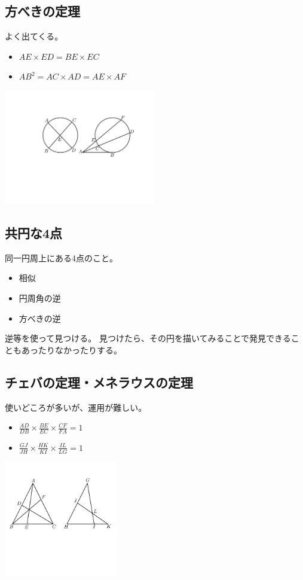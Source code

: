 \documentclass[uplatex,dvipdfmx]{jsbook}
\begin{document}
\subsection{方べきの定理}
よく出てくる。
\begin{itemize}
    \item $AE\times ED=BE\times EC$
    \item $AB^2=AC\times AD = AE \times AF$
\end{itemize}

\includegraphics[clip,height=5cm]{figures/houbeki.pdf}

\subsection{共円な4点}
同一円周上にある4点のこと。
\begin{itemize}
    \item 相似
    \item 円周角の逆
    \item 方べきの逆
\end{itemize}
逆等を使って見つける。
見つけたら、その円を描いてみることで発見できることもあったりなかったりする。

\subsection{チェバの定理・メネラウスの定理}
使いどころが多いが、運用が難しい。
\begin{itemize}

    \item $\displaystyle \frac{AD}{DB} \times \frac{BE}{EC} \times \frac{CF}{FA} = 1$
    \item $\displaystyle \frac{GJ}{JH} \times \frac{HK}{KI} \times \frac{IL}{LG} = 1$
\end{itemize}

\includegraphics[clip,height=5cm]{figures/Ceva_Menelaus.pdf}
\end{document}
